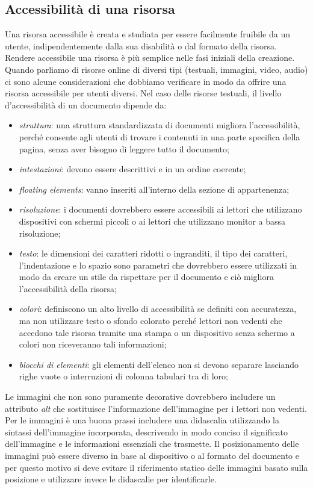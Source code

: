 \subsection{Accessibilità di una risorsa}
Una risorsa accessibile è creata e studiata per essere facilmente fruibile da un utente, indipendentemente dalla sua disabilità o dal formato della risorsa. Rendere accessibile una risorsa è più semplice nelle fasi iniziali della creazione. Quando parliamo di risorse online di diversi tipi (testuali, immagini, video, audio) ci sono alcune considerazioni che dobbiamo verificare in modo da offrire una risorsa accessibile per utenti diversi. Nel caso delle risorse testuali, il livello d'accessibilità di un documento dipende da:
\begin{itemize}
    \item \textit{struttura}: una struttura standardizzata di documenti migliora l'accessibilità, perché consente agli utenti di trovare i contenuti in una parte specifica della pagina, senza aver bisogno di leggere tutto il documento;
    \item \textit{intestazioni}: devono essere descrittivi e in un ordine coerente;
    \item \textit{floating elements}: vanno inseriti all'interno della sezione di appartenenza;
    \item \textit{risoluzione}: i documenti dovrebbero essere accessibili ai lettori che utilizzano dispositivi con schermi piccoli o ai lettori che utilizzano monitor a bassa risoluzione;
    \item \textit{testo}: le dimensioni dei caratteri ridotti o ingranditi, il tipo dei caratteri, l'indentazione e lo spazio sono parametri che dovrebbero essere utilizzati in modo da creare un stile da rispettare per il documento e ciò migliora l'accessibilità della risorsa;
    \item \textit{colori}: definiscono un alto livello di accessibilità se definiti con accuratezza, ma non utilizzare testo o sfondo colorato perché lettori non vedenti che accedono tale risorsa tramite una stampa o un dispositivo senza schermo a colori non riceveranno tali informazioni;
    \item \textit{blocchi di elementi}: gli elementi dell'elenco non si devono separare lasciando righe vuote o interruzioni di colonna tabulari tra di loro;
\end{itemize}

Le immagini che non sono puramente decorative dovrebbero includere un attributo \textit{alt} che sostituisce l'informazione dell'immagine per i lettori non vedenti. Per le immagini è una buona prassi includere una didascalia utilizzando la sintassi dell'immagine incorporata, descrivendo in modo conciso il significato dell'immagine e le informazioni essenziali che trasmette. Il posizionamento delle immagini può essere diverso in base al dispositivo o al formato del documento e per questo motivo si deve evitare il riferimento statico delle immagini basato sulla posizione e utilizzare invece le didascalie per identificarle.

